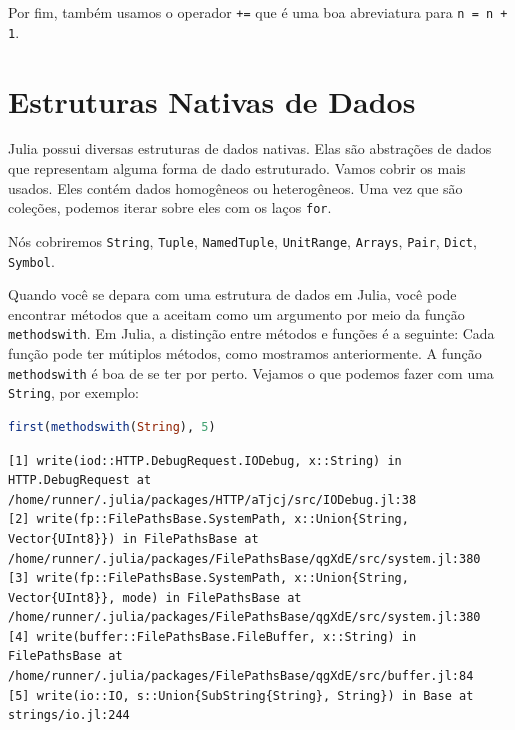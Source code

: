 \documentclass[
  notoc %
]{tufte-book}
\newcommand{\passthrough}[1]{#1}
\begin{document}
Por fim, também usamos o operador \passthrough{\lstinline!+=!} que é uma
boa abreviatura para \passthrough{\lstinline!n = n + 1!}.

\hypertarget{sec:data_structures}{%
\section{Estruturas Nativas de Dados}\label{sec:data_structures}}

Julia possui diversas estruturas de dados nativas. Elas são abstrações
de dados que representam alguma forma de dado estruturado. Vamos cobrir
os mais usados. Eles contém dados homogêneos ou heterogêneos. Uma vez
que são coleções, podemos iterar sobre eles com os laços
\passthrough{\lstinline!for!}.

Nós cobriremos \passthrough{\lstinline!String!},
\passthrough{\lstinline!Tuple!}, \passthrough{\lstinline!NamedTuple!},
\passthrough{\lstinline!UnitRange!}, \passthrough{\lstinline!Arrays!},
\passthrough{\lstinline!Pair!}, \passthrough{\lstinline!Dict!},
\passthrough{\lstinline!Symbol!}.

Quando você se depara com uma estrutura de dados em Julia, você pode
encontrar métodos que a aceitam como um argumento por meio da função
\passthrough{\lstinline!methodswith!}. Em Julia, a distinção entre
métodos e funções é a seguinte: Cada função pode ter mútiplos métodos,
como mostramos anteriormente. A função
\passthrough{\lstinline!methodswith!} é boa de se ter por perto. Vejamos
o que podemos fazer com uma \passthrough{\lstinline!String!}, por
exemplo:

\begin{lstlisting}[language=Julia]
first(methodswith(String), 5)
\end{lstlisting}

\begin{lstlisting}[language=Output]
[1] write(iod::HTTP.DebugRequest.IODebug, x::String) in HTTP.DebugRequest at /home/runner/.julia/packages/HTTP/aTjcj/src/IODebug.jl:38
[2] write(fp::FilePathsBase.SystemPath, x::Union{String, Vector{UInt8}}) in FilePathsBase at /home/runner/.julia/packages/FilePathsBase/qgXdE/src/system.jl:380
[3] write(fp::FilePathsBase.SystemPath, x::Union{String, Vector{UInt8}}, mode) in FilePathsBase at /home/runner/.julia/packages/FilePathsBase/qgXdE/src/system.jl:380
[4] write(buffer::FilePathsBase.FileBuffer, x::String) in FilePathsBase at /home/runner/.julia/packages/FilePathsBase/qgXdE/src/buffer.jl:84
[5] write(io::IO, s::Union{SubString{String}, String}) in Base at strings/io.jl:244
\end{lstlisting}
\end{document}
